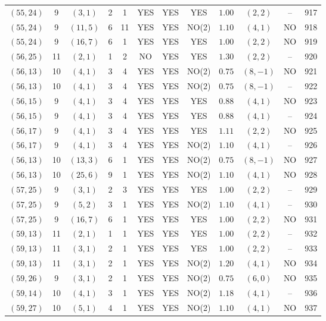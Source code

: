 \begin{longtable}{|c|c|c|c|c|c|c|c|c|c|c|c|}
$(55,24)$ & 9 & $(3,1)$ & 2 & 1 & YES & YES & YES & $1.00$ & $(2,2)$ & -- & 917\\
$(55,24)$ & 9 & $(11,5)$ & 6 & 11 & YES & YES & NO(2) & $1.10$ & $(4,1)$ & NO & 918\\
$(55,24)$ & 9 & $(16,7)$ & 6 & 1 & YES & YES & YES & $1.00$ & $(2,2)$ & NO & 919\\
$(56,25)$ & 11 & $(2,1)$ & 1 & 2 & NO & YES & YES & $1.30$ & $(2,2)$ & -- & 920\\
$(56,13)$ & 10 & $(4,1)$ & 3 & 4 & YES & YES & NO(2) & $0.75$ & $(8,-1)$ & NO & 921\\
$(56,13)$ & 10 & $(4,1)$ & 3 & 4 & YES & YES & NO(2) & $0.75$ & $(8,-1)$ & -- & 922\\
$(56,15)$ & 9 & $(4,1)$ & 3 & 4 & YES & YES & YES & $0.88$ & $(4,1)$ & NO & 923\\
$(56,15)$ & 9 & $(4,1)$ & 3 & 4 & YES & YES & YES & $0.88$ & $(4,1)$ & -- & 924\\
$(56,17)$ & 9 & $(4,1)$ & 3 & 4 & YES & YES & YES & $1.11$ & $(2,2)$ & NO & 925\\
$(56,17)$ & 9 & $(4,1)$ & 3 & 4 & YES & YES & NO(2) & $1.10$ & $(4,1)$ & -- & 926\\
$(56,13)$ & 10 & $(13,3)$ & 6 & 1 & YES & YES & NO(2) & $0.75$ & $(8,-1)$ & NO & 927\\
$(56,13)$ & 10 & $(25,6)$ & 9 & 1 & YES & YES & NO(2) & $1.10$ & $(4,1)$ & NO & 928\\
$(57,25)$ & 9 & $(3,1)$ & 2 & 3 & YES & YES & YES & $1.00$ & $(2,2)$ & -- & 929\\
$(57,25)$ & 9 & $(5,2)$ & 3 & 1 & YES & YES & NO(2) & $1.10$ & $(4,1)$ & -- & 930\\
$(57,25)$ & 9 & $(16,7)$ & 6 & 1 & YES & YES & YES & $1.00$ & $(2,2)$ & NO & 931\\
$(59,13)$ & 11 & $(2,1)$ & 1 & 1 & YES & YES & YES & $1.00$ & $(2,2)$ & -- & 932\\
$(59,13)$ & 11 & $(3,1)$ & 2 & 1 & YES & YES & YES & $1.00$ & $(2,2)$ & -- & 933\\
$(59,13)$ & 11 & $(3,1)$ & 2 & 1 & YES & YES & NO(2) & $1.20$ & $(4,1)$ & NO & 934\\
$(59,26)$ & 9 & $(3,1)$ & 2 & 1 & YES & YES & NO(2) & $0.75$ & $(6,0)$ & NO & 935\\
$(59,14)$ & 10 & $(4,1)$ & 3 & 1 & YES & YES & NO(2) & $1.18$ & $(4,1)$ & -- & 936\\
$(59,27)$ & 10 & $(5,1)$ & 4 & 1 & YES & YES & NO(2) & $1.10$ & $(4,1)$ & NO & 937\\

\end{longtable}
